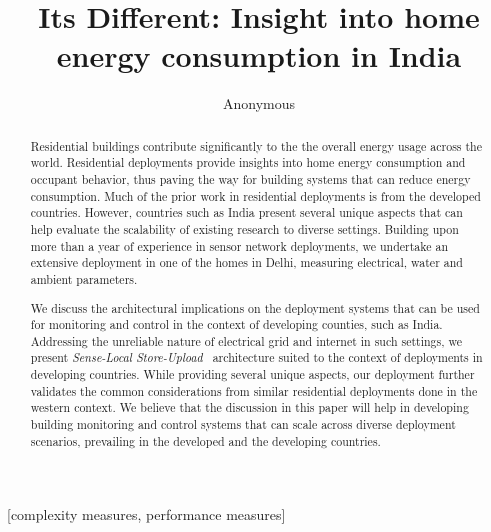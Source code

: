 \documentclass[10pt]{sensys-proc}
\author{
%
\alignauthor Anonymous \\
       \email{xyz@zyz.edu}
}
\title{Its Different: Insight into home energy consumption in India}
\newcommand{\paradigms}{Sense-Local Store-Upload~}
\begin{document}
\maketitle

\begin{abstract}
Residential buildings contribute significantly to the the overall energy usage across the world. Residential deployments provide insights into home energy consumption and occupant behavior, thus paving the way for building systems that can reduce energy consumption. Much of the prior work in residential deployments is from the developed countries. However, countries such as India present several unique aspects that can help evaluate the scalability of existing research to diverse settings. Building upon more than a year of experience in sensor network deployments, we undertake an extensive deployment in one of the homes in Delhi, measuring electrical, water and ambient parameters. 

We discuss the architectural implications on the deployment systems that can be used for monitoring and control in the context of developing counties, such as India. Addressing the unreliable nature of electrical grid and internet in such settings, we present \emph{\paradigms} architecture suited to the context of deployments in developing countries. While providing several unique aspects, our deployment further validates the common considerations from similar residential deployments done in the western context. We believe that the discussion in this paper will help in developing building monitoring and control systems that can scale across diverse deployment scenarios, prevailing in the developed and the developing countries.
\end{abstract}

[complexity measures, performance measures]


\end{document}
